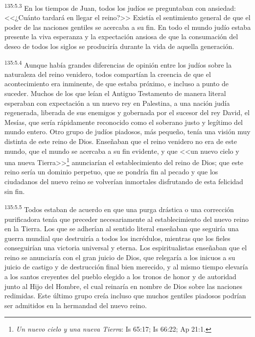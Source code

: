 \par 
\textsuperscript{135:5.3} En los tiempos de Juan, todos los judíos se preguntaban con ansiedad: <<¿Cuánto tardará en llegar el reino?>> Existía el sentimiento general de que el poder de las naciones gentiles se acercaba a su fin. En todo el mundo judío estaba presente la viva esperanza y la expectación ansiosa de que la consumación del deseo de todos los siglos se produciría durante la vida de aquella generación.

\par 
\textsuperscript{135:5.4} Aunque había grandes diferencias de opinión entre los judíos sobre la naturaleza del reino venidero, todos compartían la creencia de que el acontecimiento era inminente, de que estaba próximo, e incluso a punto de suceder. Muchos de los que leían el Antiguo Testamento de manera literal esperaban con expectación a un nuevo rey en Palestina, a una nación judía regenerada, liberada de sus enemigos y gobernada por el sucesor del rey David, el Mesías, que sería rápidamente reconocido como el soberano justo y legítimo del mundo entero. Otro grupo de judíos piadosos, más pequeño, tenía una visión muy distinta de este reino de Dios. Enseñaban que el reino venidero no era de este mundo, que el mundo se acercaba a su fin evidente, y que <<un nuevo cielo y una nueva Tierra>>\footnote{\textit{Un nuevo cielo y una nueva Tierra}: Is 65:17; Is 66:22; Ap 21:1.} anunciarían el establecimiento del reino de Dios; que este reino sería un dominio perpetuo, que se pondría fin al pecado y que los ciudadanos del nuevo reino se volverían inmortales disfrutando de esta felicidad sin fin.

\par 
\textsuperscript{135:5.5} Todos estaban de acuerdo en que una purga drástica o una corrección purificadora tenía que preceder necesariamente al establecimiento del nuevo reino en la Tierra. Los que se adherían al sentido literal enseñaban que seguiría una guerra mundial que destruiría a todos los incrédulos, mientras que los fieles conseguirían una victoria universal y eterna. Los espiritualistas enseñaban que el reino se anunciaría con el gran juicio de Dios, que relegaría a los inicuos a su juicio de castigo y de destrucción final bien merecido, y al mismo tiempo elevaría a los santos creyentes del pueblo elegido a los tronos de honor y de autoridad junto al Hijo del Hombre, el cual reinaría en nombre de Dios sobre las naciones redimidas. Este último grupo creía incluso que muchos gentiles piadosos podrían ser admitidos en la hermandad del nuevo reino.

